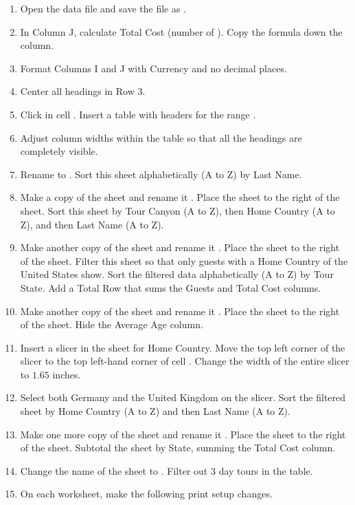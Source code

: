\begin{enumerate}
	\item Open the data file  and save the file as .
	\item In Column J, calculate Total Cost (number of ). Copy the formula down the column.
	\item Format Columns I and J with Currency and no decimal places.
	\item Center all headings in Row 3.
	\item Click in cell . Insert a table with headers for the range .
	\item Adjust column widths within the table so that all the headings are completely visible.
	\item Rename  to . Sort this sheet alphabetically (A to Z) by Last Name.
	\item Make a copy of the  sheet and rename it . Place the  sheet to the right of the  sheet. Sort this sheet by Tour Canyon (A to Z), then Home Country (A to Z), and then Last Name (A to Z).
	\item Make another copy of the  sheet and rename it . Place the  sheet to the right of the  sheet. Filter this sheet so that only guests with a Home Country of the United States show. Sort the filtered data alphabetically (A to Z) by Tour State. Add a Total Row that sums the Guests and Total Cost columns.
	\item Make another copy of the  sheet and rename it . Place the  sheet to the right of the  sheet. Hide the Average Age column.
	\item Insert a slicer in the  sheet for Home Country. Move the top left corner of the slicer to the top left-hand corner of cell . Change the width of the entire slicer to $ 1.65 $ inches.
	\item Select both Germany and the United Kingdom on the slicer. Sort the filtered sheet by Home Country (A to Z) and then Last Name (A to Z).
	\item Make one more copy of the  sheet and rename it . Place the  sheet to the right of the  sheet. Subtotal the sheet by State, summing the Total Cost column.
	\item Change the name of the  sheet to . Filter out $ 3 $ day tours in the table.
	\item On each worksheet, make the following print setup changes.


\end{enumerate}
